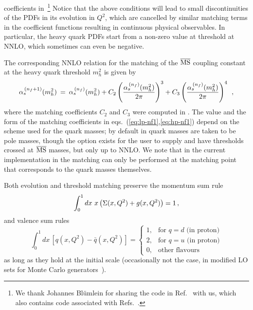 coefficients
in~\cite{Bierenbaum:2009mv,Ablinger:2010ty,Kawamura:2012cr,Blumlein:2012vq,ABLINGER2014263,Ablinger:2014nga,Ablinger:2014vwa,Behring:2014eya,Ablinger:2019etw,Behring:2021asx,Fael:2022miw,Ablinger:2023ahe,Ablinger:2024xtt,BlumleinCode}\footnote{We
thank Johannes Bl\"umlein for sharing the code in
Ref.~\cite{BlumleinCode} with us, which also contains code associated
with Refs.~\cite{Ablinger:2024xtt,Fael:2022miw}.
%
}
%
Notice that the above
conditions will lead to small discontinuities of the PDFs in its
evolution in $Q^2$, which are cancelled by similar matching terms in
the coefficient functions  resulting in continuous physical
observables. In particular, the heavy quark PDFs start from a non-zero
value at threshold at NNLO, which sometimes can even be negative.

The corresponding NNLO relation for the matching of the $\overline{\mathrm{MS}}$
coupling constant at the heavy quark threshold $m^2_h$ is given by 
\begin{equation}
\label{eq:as-nf1}
  \alpha_s^{\, (n_f+1)}(m_h^2) \: = \:
  \alpha_s^{\, (n_f)} (m_h^2) +   C_2 \left( \frac{\alpha_s^{\, (n_f)} (m_h^2)}{2\pi} \right)^3+   C_3 \left( \frac{\alpha_s^{\, (n_f)} (m_h^2)}{2\pi} \right)^4
   \:\: ,
\end{equation}
where the matching coefficients $C_2$ and $C_3$ were computed in
\cite{Chetyrkin:1997sg,Chetyrkin:1997un}.
%
The value and the form of the matching coefficients in
eqs.~(\ref{eq:lp-nf1},\ref{eq:hp-nf1}) depend on the scheme used for
the quark masses; by default in \hoppet quark masses are taken to be
pole masses, though the option exists for the user to supply and have
thresholds crossed at $\overline{\mathrm{MS}}$ masses, but only up to NNLO. We note
that in the current implementation in \hoppet the matching can only be
performed at the matching point that corresponds to the quark masses
themselves.

Both evolution and threshold matching preserve the momentum sum rule
\begin{equation}
  \int_0^1 dx~x \left( \Sigma(x,Q^2)+g(x,Q^2)\right) =1 \,,
\end{equation}
and valence sum rules
\begin{equation}
  \int_0^1 dx\, \left[q(x,Q^2)-{\bar q}(x,Q^2) \right] = \left\{ 
    \begin{array}{ll}
      1, & \text{for } q = d \text{ (in proton)}\\
      2, & \text{for } q = u \text{ (in proton)}\\
      0, & \text{other flavours}
    \end{array}
    \right.
\end{equation}
as long as they hold at the initial scale (occasionally not the case,
\eg in modified LO sets for Monte Carlo
generators~\cite{Sherstnev:2008dm}).

